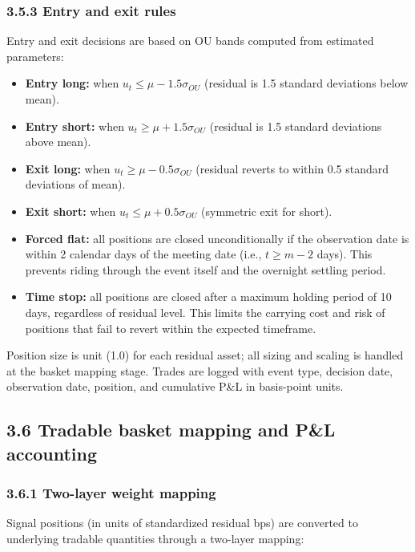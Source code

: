 \subsubsection*{3.5.3 Entry and exit rules}

Entry and exit decisions are based on OU bands computed from estimated parameters:
\begin{itemize}
    \item \textbf{Entry long:} when $u_t \leq \mu - 1.5 \sigma_{OU}$ (residual is 1.5 standard deviations below mean).
    \item \textbf{Entry short:} when $u_t \geq \mu + 1.5 \sigma_{OU}$ (residual is 1.5 standard deviations above mean).
    \item \textbf{Exit long:} when $u_t \geq \mu - 0.5 \sigma_{OU}$ (residual reverts to within 0.5 standard deviations of mean).
    \item \textbf{Exit short:} when $u_t \leq \mu + 0.5 \sigma_{OU}$ (symmetric exit for short).
    \item \textbf{Forced flat:} all positions are closed unconditionally if the observation date is within 2 calendar days of the meeting date (i.e., $t \geq m - 2$ days). This prevents riding through the event itself and the overnight settling period.
    \item \textbf{Time stop:} all positions are closed after a maximum holding period of 10 days, regardless of residual level. This limits the carrying cost and risk of positions that fail to revert within the expected timeframe.
\end{itemize}

Position size is unit (1.0) for each residual asset; all sizing and scaling is handled at the basket mapping stage. Trades are logged with event type, decision date, observation date, position, and cumulative P\&L in basis-point units.

\subsection*{3.6 Tradable basket mapping and P\&L accounting}

\subsubsection*{3.6.1 Two-layer weight mapping}

Signal positions (in units of standardized residual bps) are converted to underlying tradable quantities through a two-layer mapping:

